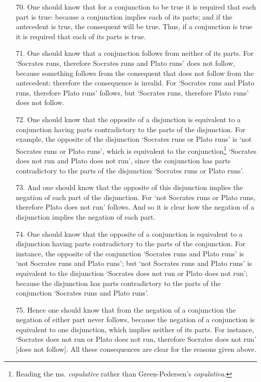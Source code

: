 \begin{enumerate}
\item[70.] One should know that for a conjunction to be true it is required that each part is true: because a conjunction implies each of its parts; and if the antecedent is true, the consequent will be true. Thus, if a conjunction is true it is required that each of its parts is true.
\item[71.] One should know that a conjunction follows from neither of its parts. For `Socrates runs, therefore Socrates runs and Plato runs' does not follow, because something follows from the consequent that does not follow from the antecedent; therefore the consequence is invalid. For `Socrates runs and Plato runs, therefore Plato runs' follows, but `Socrates runs, therefore Plato runs' does not follow.
\item[72.] One should know that the opposite of a disjunction is equivalent to a conjunction having parts contradictory to the parts of the disjunction. For example, the opposite of the disjunction `Socrates runs or Plato runs' is `not Socrates runs or Plato runs', which is equivalent to the conjunction\footnote{Reading the ms. \textit{copulative} rather than Green-Pedersen's \textit{copulativa}.} `Socrates does not run and Plato does not run', since the conjunction has parts contradictory to the parts of the disjunction `Socrates runs or Plato runs'.
\item[73.] And one should know that the opposite of this disjunction implies the negation of each part of the disjunction. For `not Socrates runs or Plato runs, therefore Plato does not run' follows. And so it is clear how the negation of a disjunction implies the negation of each part.
\item[74.] One should know that the opposite of a conjunction is equivalent to a disjunction having parts contradictory to the parts of the conjunction. For instance, the opposite of the conjunction `Socrates runs and Plato runs' is `not Socrates runs and Plato runs'; but `not Socrates runs and Plato runs' is equivalent to the disjunction `Socrates does not run or Plato does not run'; because the disjunction has parts contradictory to the parts of the conjunction `Socrates runs and Plato runs'.
\item[75.] Hence one should know that from the negation of a conjunction the negation of either part never follows, because the negation of a conjunction is equivalent to one disjunction, which implies neither of its parts. For instance, `Socrates does not run or Plato does not run, therefore Socrates does not run' [does not follow]. All these consequences are clear for the reasons given above.

\end{enumerate}
